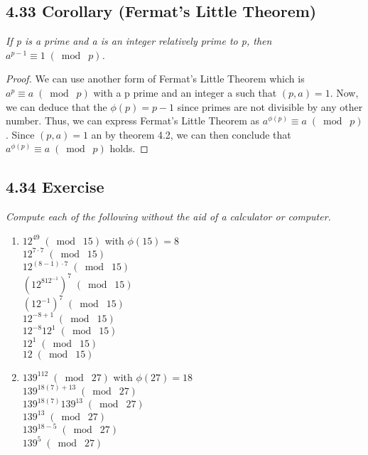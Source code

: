 \documentclass{article}
\begin{document}
\subsection*{4.33 Corollary (Fermat's Little Theorem)} 
\quad \textit{If p is a prime and a is an integer relatively prime to p, then $a^{p-1} \equiv 1 \;(\bmod\; p)$.}

\begin{proof}
We can use another form of Fermat's Little Theorem which is $a^p \equiv a \;(\bmod\; p)$ with a p prime and an integer a such that $(p,a) = 1$. Now, we can deduce that the $\phi(p) = p-1$ since primes are not divisible by any other number. Thus, we can express Fermat's Little Theorem as $a^{\phi(p)} \equiv a \;(\bmod\; p)$. Since $(p,a) = 1$ an by theorem 4.2, we can then conclude that $a^{\phi(p)} \equiv a \;(\bmod\; p)$ holds.
\end{proof}

\subsection*{4.34 Exercise} 
\quad \textit{Compute each of the following without the aid of a calculator or computer.}

\begin{enumerate}
    \item $12^{49} \;(\bmod\; 15)$ with $\phi(15) = 8$\\
          $12^{7\cdot 7} \;(\bmod\; 15)$\\
          $12^{(8-1)\cdot 7} \;(\bmod\; 15)$\\
          $(12^812^{-1})^7 \;(\bmod\; 15)$\\
          $(12^{-1})^7 \;(\bmod\; 15)$\\
          $12^{-8+1} \;(\bmod\; 15)$\\
          $12^{-8}12^1 \;(\bmod\; 15)$\\
          $12^1 \;(\bmod\; 15)$\\
          $12 \;(\bmod\; 15)$\\
    \item $139^{112} \;(\bmod\; 27)$ with $\phi(27) = 18$\\
          $139^{18(7) + 13} \;(\bmod\; 27)$\\
          $139^{18(7)}139^{13} \;(\bmod\; 27)$\\
          $139^13 \;(\bmod\; 27)$\\
          $139^{18-5} \;(\bmod\; 27)$\\
          $139^5 \;(\bmod\; 27)$
\end{enumerate}
\end{document}
